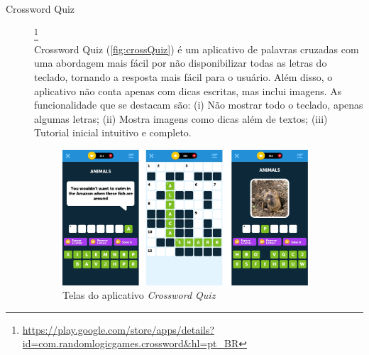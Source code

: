 \begin{description}
\item[Crossword Quiz]\footnote{\url{https://play.google.com/store/apps/details?id=com.randomlogicgames.crossword&hl=pt_BR}} \hfill \\
Crossword Quiz (\autoref{fig:crossQuiz}) é um aplicativo de palavras cruzadas com uma abordagem mais fácil por não disponibilizar todas as letras do teclado, tornando a resposta mais fácil para o usuário. Além disso, o aplicativo não conta apenas com dicas escritas, mas inclui imagens. As funcionalidade que se destacam são: (i) Não mostrar todo o teclado, apenas algumas letras; (ii) Mostra imagens como dicas além de textos; (iii) Tutorial inicial intuitivo e completo.

\begin{figure}[H]
\centering
    \includegraphics[width=0.9\textwidth]{Figuras/crosswordQuiz.jpg}
    \caption{Telas do aplicativo \textit{Crossword Quiz}}
    \label{fig:crossQuiz}
\end{figure}

\end{description}



